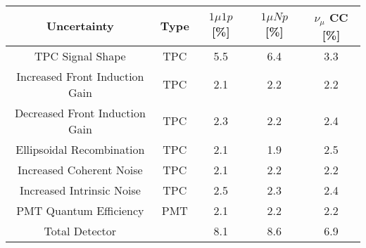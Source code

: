 \begin{tabular}{ccccc}
\toprule
Uncertainty & Type & $1\mu1p$ [\%] & $1\mu Np$ [\%] & $\nu_\mu$ CC [\%] \\
\midrule
TPC Signal Shape & TPC & 5.5 & 6.4 & 3.3 \\
Increased Front Induction Gain & TPC & 2.1 & 2.2 & 2.2 \\
Decreased Front Induction Gain & TPC & 2.3 & 2.2 & 2.4 \\
Ellipsoidal Recombination & TPC & 2.1 & 1.9 & 2.5 \\
Increased Coherent Noise & TPC & 2.1 & 2.2 & 2.2 \\
Increased Intrinsic Noise & TPC & 2.5 & 2.3 & 2.4 \\
PMT Quantum Efficiency & PMT & 2.1 & 2.2 & 2.2 \\
\midrule
Total Detector &  & 8.1 & 8.6 & 6.9 \\
\bottomrule
\end{tabular}